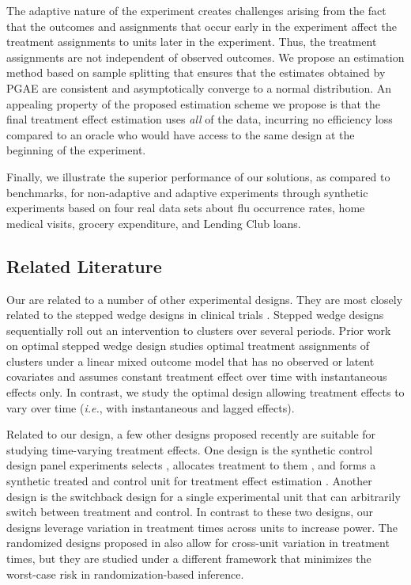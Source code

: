     The adaptive nature of the experiment  creates challenges arising from the fact that the outcomes and assignments that occur early in the experiment affect the treatment assignments to units later in the experiment.
    Thus, the treatment assignments are not independent of observed outcomes. We propose an estimation method based on sample splitting that ensures that the estimates obtained by PGAE are consistent and asymptotically converge to a normal distribution. 
     An appealing property of the proposed estimation scheme we propose is that the final treatment effect estimation uses \emph{all} of the data, incurring no efficiency loss compared to an oracle who would have access to the same design at the beginning of the experiment.
     
     Finally, we illustrate the superior performance of our solutions, as compared to benchmarks, for non-adaptive and adaptive experiments through synthetic experiments based on four real data sets about flu occurrence rates, home medical visits, grocery expenditure, and Lending Club loans. 
     
	

    
    \subsection{Related Literature}
	Our  are related to a number of other experimental designs. They are most closely related to the stepped wedge designs in clinical trials \citep{brown2006stepped}. Stepped wedge designs sequentially roll out an intervention to clusters over several periods. Prior work on optimal stepped wedge design \citep{hussey2007design,hemming2015stepped,li2018optimal} studies optimal treatment assignments of clusters under a linear mixed outcome model that has no observed or latent covariates and assumes constant treatment effect over time  with instantaneous effects only. In contrast, we study the optimal design allowing treatment effects to vary over time ({\it i.e.}, with instantaneous and lagged effects). 

    Related to our design, a few other designs proposed recently are suitable for studying time-varying treatment effects. One design is the synthetic control design  panel experiments  selects , allocates treatment to  them , and forms a synthetic treated and control unit for treatment effect estimation \citep{doudchenkodesigning2021,doudchenko2021synthetic,abadie2021synthetic}. Another design is the switchback design \citep{bojinov2020design,xiong2023bias} for a single experimental unit that can arbitrarily switch between treatment and control. In contrast to these two designs, our designs leverage variation in treatment times across units to increase power. The randomized designs proposed in \cite{basse2019minimax} also allow for cross-unit variation in treatment times, but they are studied under a different framework that minimizes the worst-case risk in randomization-based inference.
    
